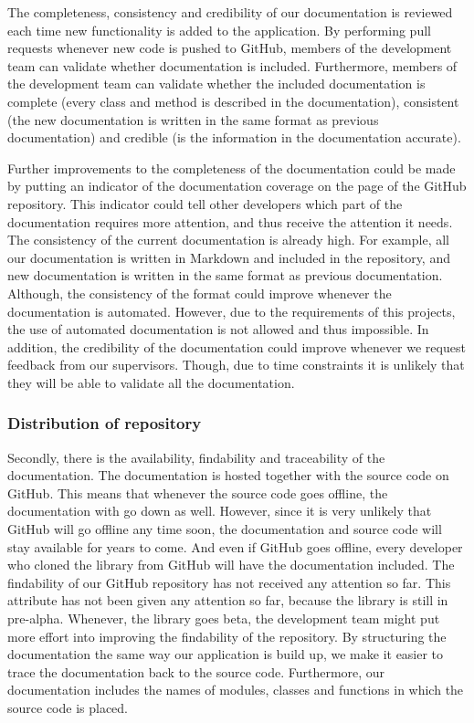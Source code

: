 \documentclass{article}
\begin{document}
    The completeness, consistency and credibility of our documentation is reviewed each time new functionality is added to the application. By performing pull requests
    whenever new code is pushed to GitHub, members of the development team can validate whether documentation is included. Furthermore, members of the development team
    can validate whether the included documentation is complete (every class and method is described in the documentation), consistent (the new documentation is written
    in the same format as previous documentation) and credible (is the information in the documentation accurate).

    Further improvements to the completeness of the documentation could be made by putting an indicator of the documentation coverage on the page of the GitHub repository.
    This indicator could tell other developers which part of the documentation requires more attention, and thus receive the attention it needs.
    The consistency of the current documentation is already high. For example, all our documentation is written in Markdown and included in the repository, and new documentation
    is written in the same format as previous documentation. Although, the consistency of the format could improve whenever the documentation is automated. 
    However, due to the requirements of this projects, the use of automated documentation is not allowed and thus impossible.
    In addition, the credibility of the documentation could improve whenever we request feedback from our supervisors. Though, due to time constraints it is unlikely
    that they will be able to validate all the documentation.

    \subsubsection{Distribution of repository}

    Secondly, there is the availability, findability and traceability of the documentation. The documentation is hosted together with the source code on GitHub. This means
    that whenever the source code goes offline, the documentation with go down as well. However, since it is very unlikely that GitHub will go offline any time soon, the
    documentation and source code will stay available for years to come. And even if GitHub goes offline, every developer who cloned the library from GitHub will have the
    documentation included. The findability of our GitHub repository has not received any attention so far. This attribute has not been given any attention so far, because
    the library is still in pre-alpha. Whenever, the library goes beta, the development team might put more effort into improving the findability of the repository.
    By structuring the documentation the same way our application is build up, we make it easier to trace the documentation back to the source code. Furthermore, our documentation
    includes the names of modules, classes and functions in which the source code is placed.
\end{document}

